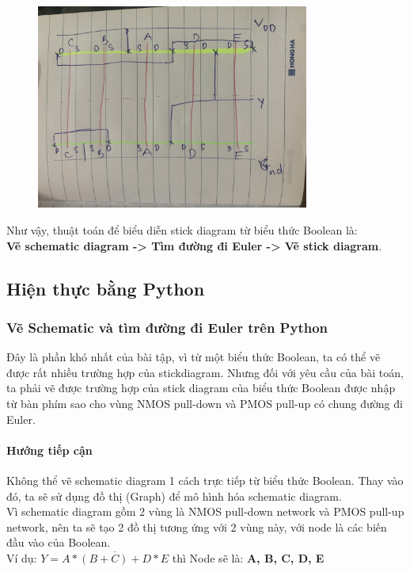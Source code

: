 \documentclass[a4paper,12pt]{article}
\begin{document}
\begin{figure}[H]
    \centering
    \includegraphics[width=0.8\textwidth]{../PNG/Stick_handwrite.jpg}
    \label{fig:Ex_Schematic}\\
\end{figure}

Như vậy, thuật toán để biểu diễn stick diagram từ biểu thức Boolean là:\\
\textbf{Vẽ schematic diagram -> Tìm đường đi Euler -> Vẽ stick diagram}.
\newpage
\subsection{Hiện thực bằng Python}
\subsubsection{Vẽ Schematic và tìm đường đi Euler trên Python}
Đây là phần khó nhất của bài tập, vì từ một biểu thức Boolean, ta có thể vẽ được rất nhiều trường hợp của stickdiagram.
Nhưng đối với yêu cầu của bài toán, ta phải vẽ được trường hợp của stick diagram của biểu thức Boolean được nhập từ bàn phím
sao cho vùng NMOS pull-down và PMOS pull-up có chung đường đi Euler.
\paragraph{Hướng tiếp cận}
Không thể vẽ schematic diagram 1 cách trực tiếp từ biểu thức Boolean.
Thay vào đó, ta sẽ sử dụng đồ thị (Graph) để mô hình hóa schematic diagram.\\
Vì schematic diagram gồm 2 vùng là NMOS pull-down network và PMOS pull-up network, nên ta sẽ tạo 2 đồ thị tương ứng với 2 vùng này, 
với node là các biến đầu vào của Boolean.\\
Ví dụ: \( Y = \overline{A *(B + C) + D * E} \) thì Node sẽ là:
\textbf{A, B, C, D, E}\\
\end{document}
